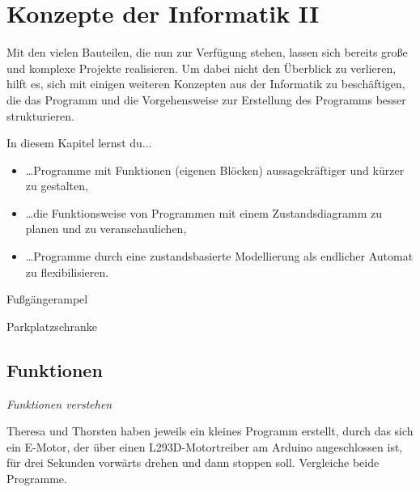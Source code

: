 \chapter{Konzepte der Informatik II}

Mit den vielen Bauteilen, die nun zur Verfügung stehen, lassen sich bereits große und komplexe Projekte realisieren. Um dabei nicht den Überblick zu verlieren, hilft es, sich mit einigen weiteren Konzepten aus der Informatik zu beschäftigen, die das Programm und die Vorgehensweise zur Erstellung des Programms besser strukturieren.

In diesem Kapitel lernst du...
\begin{itemize}
	\item \dots Programme mit Funktionen (eigenen Blöcken) aussagekräftiger und kürzer zu gestalten,
	\item \dots die Funktionsweise von Programmen mit einem Zustandsdiagramm zu planen und zu veranschaulichen,
	\item \dots Programme durch eine zustandsbasierte Modellierung als endlicher Automat zu flexibilisieren.
\end{itemize}

\bigskip

\begin{projektueberblick}
	\item Fußgängerampel \dotfill \pageref{proj:fussgaengerampel}
	\item Parkplatzschranke \dotfill \pageref{proj:parkplatzschranke}
\end{projektueberblick}
\newpage
\section{Funktionen}

\begin{aufgabe} \emph{Funktionen verstehen}
	
	Theresa und Thorsten haben jeweils ein kleines Programm erstellt, durch das sich ein E-Motor, der über einen L293D-Motortreiber am Arduino angeschlossen ist, für drei Sekunden vorwärts drehen und dann stoppen soll. Vergleiche beide Programme.
\end{aufgabe}

